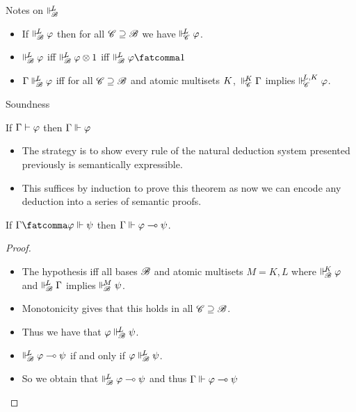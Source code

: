 \documentclass{beamer}
\begin{document}
\begin{frame}{Notes on $\Vdash_{ \!\!\mathscr{B} }^{ \!\!{L} }$}
\begin{itemize}
\item If $\Vdash_{ \!\!\mathscr{B} }^{ \!\!{L} }\varphi$ then for all $\mathscr{C} \supseteq \mathscr{B}$ we have $\Vdash_{ \!\!\mathscr{C} }^{ \!\!{L} }\varphi$.
\vspace{5pt}
\item $\Vdash_{ \!\!\mathscr{B} }^{ \!\!{L} }\varphi$  iff $\Vdash_{ \!\!\mathscr{B} }^{ \!\!{L} }\varphi\otimes1$ iff $\suppM{\baseB}{\at{L}}\varphi\fatcomma\mtop$
\vspace{5pt}
\item $\Gamma \Vdash_{ \!\!\mathscr{B} }^{ \!\!{L} }\varphi$ iff for all $\mathscr{C} \supseteq \mathscr{B}$ and atomic multisets ${K}$,\, $\Vdash_{ \!\!\mathscr{C} }^{ \!\!{K} }\Gamma$ implies $\Vdash_{ \!\!\mathscr{C} }^{ \!\!{L},{K} }\varphi$. 
\end{itemize}
\end{frame}
\begin{frame}{Soundness}
	\begin{theorem}[Soundness]
		\centering
		If $\Gamma\vdash\varphi$ then $\Gamma\Vdash_{ \!\! }^{ \!\! }\varphi$
	\end{theorem}
	\pause
	\begin{itemize}
		\item The strategy is to show every rule of the natural deduction system presented previously is semantically expressible.
		\item This suffices by induction to prove this theorem as now we can encode any deduction into a series of semantic proofs.
	\end{itemize}
\end{frame}
\begin{frame}
	\begin{example}
		\centering
		If $\Gamma\fatcomma\varphi \suppM{}{}\psi$ then $\Gamma\Vdash_{ \!\! }^{ \!\! }\varphi\multimap\psi$.
	\end{example}
	\begin{proof}
		\begin{itemize}
			\item The hypothesis iff all bases $\mathscr{B}$ and atomic multisets $M=K,L$ where $\Vdash_{ \!\!\mathscr{B} }^{ \!\!K }\varphi$ and $\Vdash_{ \!\!\mathscr{B} }^{ \!\!L }\Gamma$ implies $\Vdash_{ \!\!\mathscr{B} }^{ \!\!M }\psi$.
			\pause
			\item Monotonicity gives that this holds in all $\mathscr{C} \supseteq \mathscr{B}$.
			\pause
			\item Thus we have that $\varphi\Vdash_{ \!\!\mathscr{B} }^{ \!\!L }\psi$.
			\pause
			\item $\Vdash_{ \!\!\mathscr{B} }^{ \!\!L }\varphi\multimap\psi$ if and only if $\varphi\Vdash_{ \!\!\mathscr{B} }^{ \!\!L }\psi$.
			\pause
			\item So we obtain that $\Vdash_{ \!\!\mathscr{B} }^{ \!\!L }\varphi\multimap\psi$ and thus $\Gamma\Vdash_{ \!\! }^{ \!\! }\varphi\multimap\psi$
		\end{itemize}
	\end{proof}
\end{frame}
\end{document}
